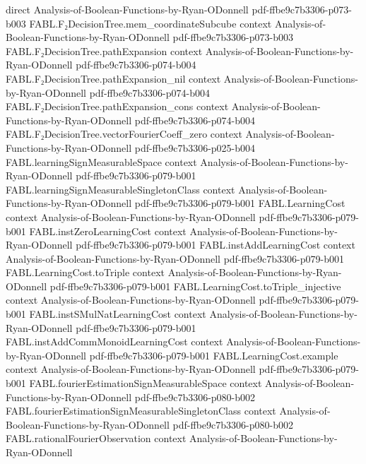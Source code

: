 \begin{theorem}
  {direct}
  {Analysis-of-Boolean-Functions-by-Ryan-ODonnell}
  {pdf-ffbe9c7b3306-p073-b003}
\proofstep
  {FABL.F₂DecisionTree.mem_coordinateSubcube}
  {context}
  {Analysis-of-Boolean-Functions-by-Ryan-ODonnell}
  {pdf-ffbe9c7b3306-p073-b003}
\proofstep
  {FABL.F₂DecisionTree.pathExpansion}
  {context}
  {Analysis-of-Boolean-Functions-by-Ryan-ODonnell}
  {pdf-ffbe9c7b3306-p074-b004}
\proofstep
  {FABL.F₂DecisionTree.pathExpansion_nil}
  {context}
  {Analysis-of-Boolean-Functions-by-Ryan-ODonnell}
  {pdf-ffbe9c7b3306-p074-b004}
\proofstep
  {FABL.F₂DecisionTree.pathExpansion_cons}
  {context}
  {Analysis-of-Boolean-Functions-by-Ryan-ODonnell}
  {pdf-ffbe9c7b3306-p074-b004}
\proofstep
  {FABL.F₂DecisionTree.vectorFourierCoeff_zero}
  {context}
  {Analysis-of-Boolean-Functions-by-Ryan-ODonnell}
  {pdf-ffbe9c7b3306-p025-b004}
\proofstep
  {FABL.learningSignMeasurableSpace}
  {context}
  {Analysis-of-Boolean-Functions-by-Ryan-ODonnell}
  {pdf-ffbe9c7b3306-p079-b001}
\proofstep
  {FABL.learningSignMeasurableSingletonClass}
  {context}
  {Analysis-of-Boolean-Functions-by-Ryan-ODonnell}
  {pdf-ffbe9c7b3306-p079-b001}
\proofstep
  {FABL.LearningCost}
  {context}
  {Analysis-of-Boolean-Functions-by-Ryan-ODonnell}
  {pdf-ffbe9c7b3306-p079-b001}
\proofstep
  {FABL.instZeroLearningCost}
  {context}
  {Analysis-of-Boolean-Functions-by-Ryan-ODonnell}
  {pdf-ffbe9c7b3306-p079-b001}
\proofstep
  {FABL.instAddLearningCost}
  {context}
  {Analysis-of-Boolean-Functions-by-Ryan-ODonnell}
  {pdf-ffbe9c7b3306-p079-b001}
\proofstep
  {FABL.LearningCost.toTriple}
  {context}
  {Analysis-of-Boolean-Functions-by-Ryan-ODonnell}
  {pdf-ffbe9c7b3306-p079-b001}
\proofstep
  {FABL.LearningCost.toTriple_injective}
  {context}
  {Analysis-of-Boolean-Functions-by-Ryan-ODonnell}
  {pdf-ffbe9c7b3306-p079-b001}
\proofstep
  {FABL.instSMulNatLearningCost}
  {context}
  {Analysis-of-Boolean-Functions-by-Ryan-ODonnell}
  {pdf-ffbe9c7b3306-p079-b001}
\proofstep
  {FABL.instAddCommMonoidLearningCost}
  {context}
  {Analysis-of-Boolean-Functions-by-Ryan-ODonnell}
  {pdf-ffbe9c7b3306-p079-b001}
\proofstep
  {FABL.LearningCost.example}
  {context}
  {Analysis-of-Boolean-Functions-by-Ryan-ODonnell}
  {pdf-ffbe9c7b3306-p079-b001}
\proofstep
  {FABL.fourierEstimationSignMeasurableSpace}
  {context}
  {Analysis-of-Boolean-Functions-by-Ryan-ODonnell}
  {pdf-ffbe9c7b3306-p080-b002}
\proofstep
  {FABL.fourierEstimationSignMeasurableSingletonClass}
  {context}
  {Analysis-of-Boolean-Functions-by-Ryan-ODonnell}
  {pdf-ffbe9c7b3306-p080-b002}
\proofstep
  {FABL.rationalFourierObservation}
  {context}
  {Analysis-of-Boolean-Functions-by-Ryan-ODonnell}

\end{theorem}
